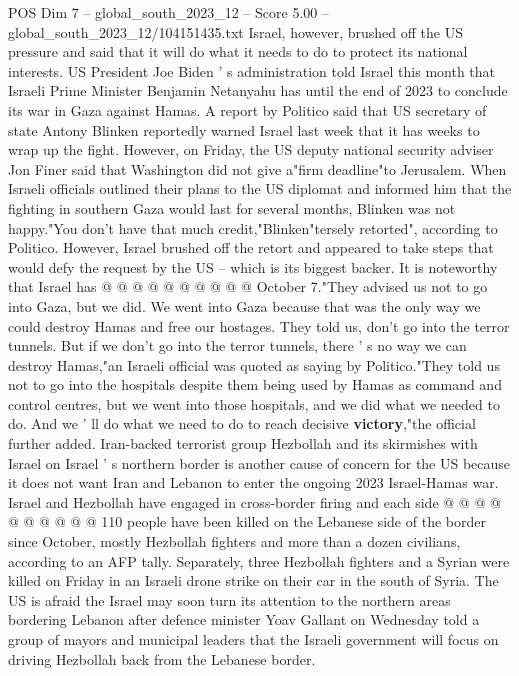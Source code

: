 \begin{textsample}{POS Dim 7 – global\_south\_2023\_12 – Score 5.00 – global\_south\_2023\_12/104151435.txt}  \label{ex:f7_pos_261}
Israel, however, brushed off the US pressure and said that it will do what it needs to do to protect its national interests.
US President Joe Biden ' s administration told Israel this month that Israeli Prime Minister Benjamin Netanyahu has until the end of 2023 to conclude its war in Gaza against Hamas.
A report by Politico said that US secretary of state Antony Blinken reportedly warned Israel last week that it has weeks to wrap up the fight.
However, on Friday, the US deputy national security adviser Jon Finer said that Washington did not give a"firm deadline"to Jerusalem.
When Israeli officials outlined their plans to the US diplomat and informed him that the fighting in southern Gaza would last for several months, Blinken was not happy."You don't have that much credit,"Blinken"tersely retorted", according to Politico.
However, Israel brushed off the retort and appeared to take steps that would defy the request by the US -- which is its biggest backer.
It is noteworthy that Israel has @ @ @ @ @ @ @ @ @ @ October 7."They advised us not to go into Gaza, but we did.
We went into Gaza because that was the only way we could destroy Hamas and free our hostages.
They told us, don't go into the terror tunnels.
But if we don't go into the terror tunnels, there ' s no way we can destroy Hamas,"an Israeli official was quoted as saying by Politico."They told us not to go into the hospitals despite them being used by Hamas as command and control centres, but we went into those hospitals, and we did what we needed to do.
And we ' ll do what we need to do to reach decisive \textbf{victory},"the official further added.
Iran-backed terrorist group Hezbollah and its skirmishes with Israel on Israel ' s northern border is another cause of concern for the US because it does not want Iran and Lebanon to enter the ongoing 2023 Israel-Hamas war.
Israel and Hezbollah have engaged in cross-border firing and each side @ @ @ @ @ @ @ @ @ @ 110 people have been killed on the Lebanese side of the border since October, mostly Hezbollah fighters and more than a dozen civilians, according to an AFP tally.
Separately, three Hezbollah fighters and a Syrian were killed on Friday in an Israeli drone strike on their car in the south of Syria.
The US is afraid the Israel may soon turn its attention to the northern areas bordering Lebanon after defence minister Yoav Gallant on Wednesday told a group of mayors and municipal leaders that the Israeli government will focus on driving Hezbollah back from the Lebanese border.

\end{textsample}
